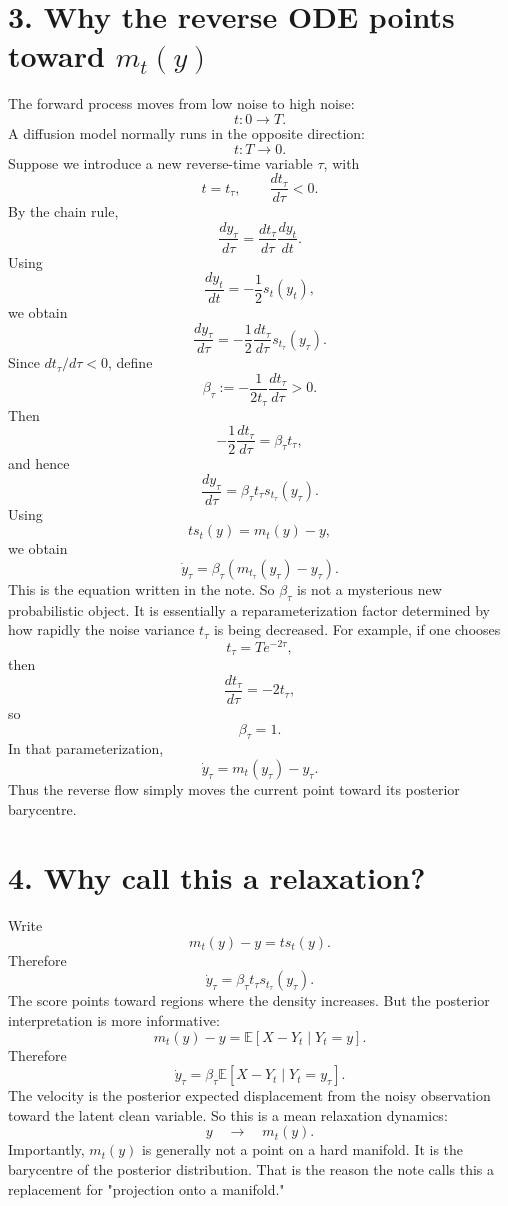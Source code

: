 \documentclass{article}
\begin{document}
\section*{3. Why the reverse ODE points toward $m_t(y)$}
The forward process moves from low noise to high noise:
\[
t:0\longrightarrow T.
\]
A diffusion model normally runs in the opposite direction:
\[
t:T\longrightarrow0.
\]
Suppose we introduce a new reverse-time variable $\tau$, with
\[
t = t_\tau,
\qquad
\frac{dt_\tau}{d\tau} < 0.
\]
By the chain rule,
\[
\frac{dy_\tau}{d\tau} = \frac{dt_\tau}{d\tau} \frac{dy_t}{dt}.
\]
Using
\[
\frac{dy_t}{dt} = -\frac12s_t(y_t),
\]
we obtain
\[
\frac{dy_\tau}{d\tau} = -\frac12\frac{dt_\tau}{d\tau} s_{t_\tau}(y_\tau).
\]
Since $dt_\tau/d\tau < 0$, define
\[
\boxed{
\beta_\tau := -\frac{1}{2t_\tau}\frac{dt_\tau}{d\tau} > 0.
}
\]
Then
\[
-\frac12\frac{dt_\tau}{d\tau} = \beta_\tau t_\tau,
\]
and hence
\[
\frac{dy_\tau}{d\tau} = \beta_\tau t_\tau s_{t_\tau}(y_\tau).
\]
Using
\[
t s_t(y) = m_t(y)-y,
\]
we obtain
\[
\boxed{
\dot y_\tau = \beta_\tau \left( m_{t_\tau}(y_\tau)-y_\tau \right).
}
\]
This is the equation written in the note.
So $\beta_\tau$ is not a mysterious new probabilistic object. It is essentially a reparameterization factor determined by how rapidly the noise variance $t_\tau$ is being decreased.
For example, if one chooses
\[
t_\tau = T e^{-2\tau},
\]
then
\[
\frac{dt_\tau}{d\tau} = -2t_\tau,
\]
so
\[
\beta_\tau = 1.
\]
In that parameterization,
\[
\boxed{
\dot y_\tau = m_t(y_\tau)-y_\tau.
}
\]
Thus the reverse flow simply moves the current point toward its posterior barycentre.

\section*{4. Why call this a relaxation?}
Write
\[
m_t(y)-y = t s_t(y).
\]
Therefore
\[
\dot y_\tau = \beta_\tau t_\tau s_{t_\tau}(y_\tau).
\]
The score points toward regions where the density increases. But the posterior interpretation is more informative:
\[
m_t(y)-y = \mathbb E[X-Y_t\mid Y_t=y].
\]
Therefore
\[
\boxed{
\dot y_\tau = \beta_\tau \mathbb E[X-Y_t\mid Y_t=y_\tau].
}
\]
The velocity is the posterior expected displacement from the noisy observation toward the latent clean variable.
So this is a mean relaxation dynamics:
\[
y \quad\longrightarrow\quad m_t(y).
\]
Importantly, $m_t(y)$ is generally not a point on a hard manifold. It is the barycentre of the posterior distribution.
That is the reason the note calls this a replacement for "projection onto a manifold."
\end{document}

